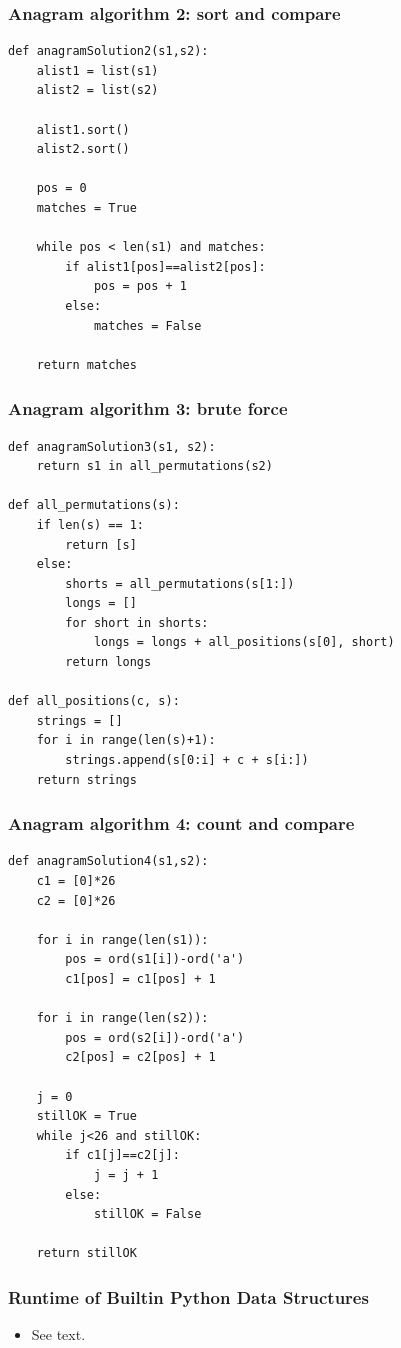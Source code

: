 \documentclass{beamer}
\newcommand{\bi}{\begin{itemize}}
\newcommand{\li}{\item}
\newcommand{\ei}{\end{itemize}}
\newcommand{\bfr}[1]{\begin{frame}[fragile]\frametitle{{ #1 }}}
\begin{document}
\bfr{Anagram algorithm 2: sort and compare}
\begin{lstlisting}
def anagramSolution2(s1,s2):
    alist1 = list(s1)
    alist2 = list(s2)

    alist1.sort()
    alist2.sort()

    pos = 0
    matches = True

    while pos < len(s1) and matches:
        if alist1[pos]==alist2[pos]:
            pos = pos + 1
        else:
            matches = False

    return matches
\end{lstlisting}
\end{frame}


\bfr{Anagram algorithm 3: brute force}
\begin{lstlisting}
def anagramSolution3(s1, s2):
    return s1 in all_permutations(s2)

def all_permutations(s):
    if len(s) == 1:
        return [s]
    else:
        shorts = all_permutations(s[1:])
        longs = []
        for short in shorts:
            longs = longs + all_positions(s[0], short)
        return longs

def all_positions(c, s):
    strings = []
    for i in range(len(s)+1):
        strings.append(s[0:i] + c + s[i:])
    return strings
\end{lstlisting}
\end{frame}


\bfr{Anagram algorithm 4: count and compare}
\begin{lstlisting}def anagramSolution4(s1,s2):
    c1 = [0]*26
    c2 = [0]*26

    for i in range(len(s1)):
        pos = ord(s1[i])-ord('a')
        c1[pos] = c1[pos] + 1

    for i in range(len(s2)):
        pos = ord(s2[i])-ord('a')
        c2[pos] = c2[pos] + 1

    j = 0
    stillOK = True
    while j<26 and stillOK:
        if c1[j]==c2[j]:
            j = j + 1
        else:
            stillOK = False

    return stillOK
\end{lstlisting}
\end{frame}

\bfr{Runtime of Builtin Python Data Structures}

\bi
\li See text.
\ei
\end{frame}
\end{document}
